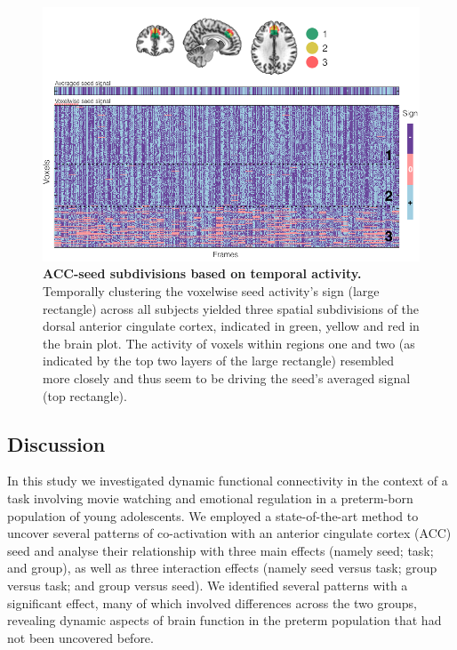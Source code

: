 \begin{figure}[h!]
\centering
\includegraphics[width=1\textwidth]{images/Ch5/Ch5_ACC_subdivisions.png}
\caption{\textbf{ACC-seed subdivisions based on temporal activity.} Temporally clustering the voxelwise seed activity's sign (large rectangle) across all subjects yielded three spatial subdivisions of the dorsal anterior cingulate cortex, indicated in green, yellow and red in the brain plot. The activity of voxels within regions one and  two (as indicated by the top two layers of the large rectangle) resembled more closely and thus seem to be driving the seed's averaged signal (top rectangle). }
\label{fig:acc_subdivisions}
\end{figure}



\subsection{Discussion}
In this study we investigated dynamic functional connectivity in the context of a task involving movie watching and emotional regulation in a preterm-born population of young adolescents. We employed a state-of-the-art method to uncover several patterns of co-activation with an anterior cingulate cortex (ACC) seed and analyse their relationship with three main effects (namely seed; task; and group), as well as three interaction effects (namely seed versus task; group versus task; and group versus seed). We identified several patterns with a significant effect, many of which involved differences across the two groups, revealing dynamic aspects of brain function in the preterm population that had not been uncovered before. 

